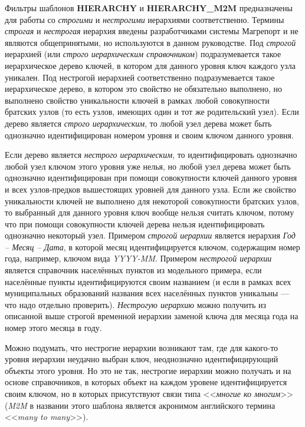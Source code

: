 \documentclass[../user-manual.tex]{subfiles}
\begin{document}
\begin{concept}
		Фильтры шаблонов \textbf{HIERARCHY} и \textbf{HIERARCHY\_M2M} предназначены для работы со \textit{строгими} и \textit{нестрогими} иерархиями соответственно. Термины \textit{строгая} и \textit{нестрогая} иерархия введены разработчиками системы Магрепорт и не являются общепринятыми, но используются в данном руководстве. Под \textit{строгой} иерархией (или \textit{строго иерархическим справочником}) подразумевается такое иерархическое дерево ключей, в котором для данного уровня ключ каждого узла уникален. Под нестрогой иерархией соответственно подразумевается такое иерархическое дерево, в котором это свойство не обязательно выполнено, но выполнено свойство уникальности ключей в рамках любой совокупности братских узлов (то есть узлов, имеющих один и тот же родительский узел). Если дерево является \textit{строго иерархическим}, то любой узел дерева может быть однозначно идентифицирован номером уровня и своим ключом данного уровня. 
		
		Если дерево является \textit{нестрого иерархическим}, то идентифицировать однозначно любой узел ключом этого уровня уже нелья, но любой узел дерева может быть однозначно идентифицирован при помощи совокупности ключей данного уровня и всех узлов-предков вышестоящих уровней для данного узла. Если же свойство уникальности ключей не выполнено для некоторой совокупности братских узлов, то выбранный для данного уровня ключ вообще нельзя считать ключом, потому что при помощи совокупности ключей дерева нельзя идентифицировать однозначно некоторый узел. Примером \textit{строгой иерархии} является иерархия \textit{Год -- Месяц -- Дата}, в которой месяц идентифицируется ключом, содержащим номер года, например, ключом вида \textit{YYYY-MM}. Примером \textit{нестрогой иерархии} является справочник населённых пунктов из модельного примера, если населённые пункты идентифицируются своим названием (и если в рамках всех муниципальных образований названия всех населённых пунктов уникальны --- что надо отдельно проверить). \textit{Нестрогую иерархию} можно получить из описанной выше строгой временн\textit{о}й иерархии заменой ключа для месяца года на номер этого месяца в году.
		
		Можно подумать, что нестрогие иерархии возникают там, где для какого-то уровня иерархии неудачно выбран ключ, неоднозначно идентифицирующий объекты этого уровня. Но это не так, нестрогие иерархии можно получать и на основе справочников, в которых объект на каждом уровене идентифицируется своим ключом, но в которых присутствуют связи типа <<\textit{многие ко многим}>> (\textit{M2M} в названии этого шаблона является акронимом английского термина <<\textit{many to many}>>). 


\end{concept}
\end{document}
